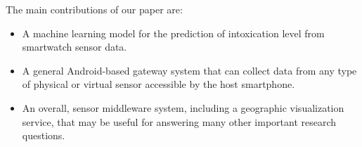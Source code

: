 The main contributions of our paper are: \begin{itemize}
	\item A machine learning model for the prediction of intoxication level from smartwatch sensor data.
	\item A general Android-based gateway system that can collect data from any type of physical or virtual sensor accessible by the host smartphone.
	\item An overall, sensor middleware system, including a geographic visualization service, that may be useful for answering many other important research questions.
\end{itemize}

